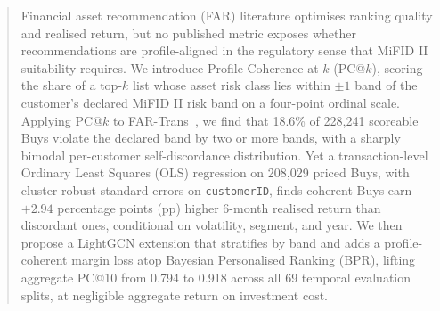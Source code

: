 \begin{abstract}
Financial asset recommendation (FAR) literature optimises ranking quality and realised return, but no published metric exposes whether recommendations are profile-aligned in the regulatory sense that MiFID II suitability requires. We introduce Profile Coherence at $k$ (PC@$k$), scoring the share of a top-$k$ list whose asset risk class lies within $\pm 1$ band of the customer's declared MiFID II risk band on a four-point ordinal scale. Applying PC@$k$ to FAR-Trans~\cite{sanzcruzado2024fartransinvestmentdatasetfinancial}, we find that 18.6\% of 228{,}241 scoreable Buys violate the declared band by two or more bands, with a sharply bimodal per-customer self-discordance distribution. Yet a transaction-level Ordinary Least Squares (OLS) regression on 208{,}029 priced Buys, with cluster-robust standard errors on \texttt{customerID}, finds coherent Buys earn $+2.94$ percentage points (pp) higher 6-month realised return than discordant ones, conditional on volatility, segment, and year. We then propose a LightGCN extension that stratifies by band and adds a profile-coherent margin loss atop Bayesian Personalised Ranking (BPR), lifting aggregate PC@10 from 0.794 to 0.918 across all 69 temporal evaluation splits, at negligible aggregate return on investment cost.
\end{abstract}
